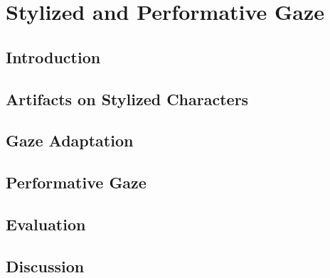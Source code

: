 \pagestyle{deposit}

\chapter{Stylized and Performative Gaze}
\label{cha:StylizedGaze}

\section{Introduction}
\label{sec:StylizedGazeIntro}


\section{Artifacts on Stylized Characters}
\label{sec:StylizedGazeArtifacts}


\section{Gaze Adaptation}
\label{sec:StylizedGazeAdaptation}


\section{Performative Gaze}
\label{sec:PerformativeGaze}


\section{Evaluation}
\label{sec:StylizedGazeEvaluation}


\section{Discussion}
\label{sec:StylizedGazeDiscussion}

